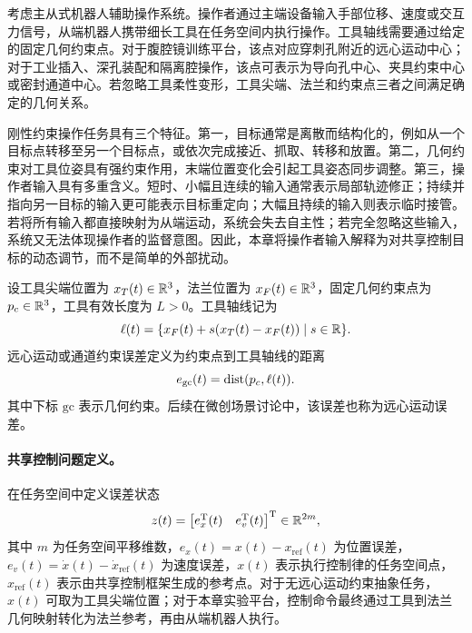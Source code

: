 考虑主从式机器人辅助操作系统。操作者通过主端设备输入手部位移、速度或交互力信号，从端机器人携带细长工具在任务空间内执行操作。工具轴线需要通过给定的固定几何约束点。对于腹腔镜训练平台，该点对应穿刺孔附近的远心运动中心；对于工业插入、深孔装配和隔离腔操作，该点可表示为导向孔中心、夹具约束中心或密封通道中心。若忽略工具柔性变形，工具尖端、法兰和约束点三者之间满足确定的几何关系。

刚性约束操作任务具有三个特征。第一，目标通常是离散而结构化的，例如从一个目标点转移至另一个目标点，或依次完成接近、抓取、转移和放置。第二，几何约束对工具位姿具有强约束作用，末端位置变化会引起工具姿态同步调整。第三，操作者输入具有多重含义。短时、小幅且连续的输入通常表示局部轨迹修正；持续并指向另一目标的输入更可能表示目标重定向；大幅且持续的输入则表示临时接管。若将所有输入都直接映射为从端运动，系统会失去自主性；若完全忽略这些输入，系统又无法体现操作者的监督意图。因此，本章将操作者输入解释为对共享控制目标的动态调节，而不是简单的外部扰动。

设工具尖端位置为 $x_T(t)\in\mathbb{R}^3$，法兰位置为 $x_F(t)\in\mathbb{R}^3$，固定几何约束点为 $p_c\in\mathbb{R}^3$，工具有效长度为 $L>0$。工具轴线记为
\begin{equation}
  \ell(t)=\{x_F(t)+s(x_T(t)-x_F(t))\mid s\in\mathbb{R}\} .
  \label{eq:ch3_tool_axis}
\end{equation}
远心运动或通道约束误差定义为约束点到工具轴线的距离
\begin{equation}
  e_{\mathrm{gc}}(t)=\operatorname{dist}(p_c,\ell(t)).
  \label{eq:ch3_gc_error}
\end{equation}
其中下标 $\mathrm{gc}$ 表示几何约束。后续在微创场景讨论中，该误差也称为远心运动误差。

\paragraph{共享控制问题定义。}
\label{subsec:ch3_problem_def}

在任务空间中定义误差状态
\begin{equation}
  z(t)=\begin{bmatrix}e_x^{\mathrm{T}}(t)&e_v^{\mathrm{T}}(t)\end{bmatrix}^{\mathrm{T}}\in\mathbb{R}^{2m},
  \label{eq:ch3_state_z}
\end{equation}
其中 $m$ 为任务空间平移维数，$e_x(t)=x(t)-x_{\mathrm{ref}}(t)$ 为位置误差，$e_v(t)=\dot x(t)-\dot x_{\mathrm{ref}}(t)$ 为速度误差，$x(t)$ 表示执行控制律的任务空间点，$x_{\mathrm{ref}}(t)$ 表示由共享控制框架生成的参考点。对于无远心运动约束抽象任务，$x(t)$ 可取为工具尖端位置；对于本章实验平台，控制命令最终通过工具到法兰几何映射转化为法兰参考，再由从端机器人执行。

